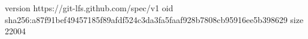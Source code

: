 version https://git-lfs.github.com/spec/v1
oid sha256:a87f91bef49457185f89afdf524c3da3fa5faaf928b7808cb95916ee5b398629
size 22004
